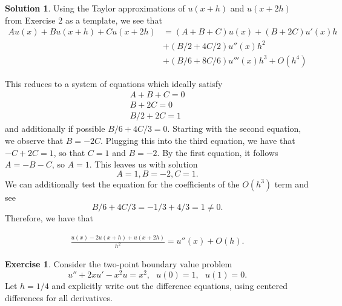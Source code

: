 \documentclass[12pt]{article}
\theoremstyle{definition}
\newtheorem{exer}{Exercise}
\newtheorem{sol}{Solution}
\theoremstyle{remark}
\begin{document}
\begin{sol}
    Using the Taylor approximations of $u(x + h)$ and $u(x + 2h)$ from Exercise 2 as a template, we see that
\begin{align*}
    A u(x) + B u(x+h) + C u(x+2h) &= (A + B + C) u(x) + (B + 2C) u'(x) h \\
                                  &+ (B / 2 + 4 C  / 2) u''(x) h^{2}\\
                                  &+ (B / 6 + 8 C / 6) u'''(x)h^{3} + O(h^{4})
\end{align*}

This reduces to a system of equations which ideally satisfy
\begin{align*}
A + B + C = 0\\
B + 2C = 0 \\
B / 2 + 2C = 1 
\end{align*}
and additionally if possible $ B / 6 + 4 C / 3 = 0$. Starting with the second equation, we observe that $B = - 2C$. Plugging this into the third equation, we have that $-C + 2C = 1$, so that $C = 1$ and $B = -2$. By the first equation, it follows $A = - B - C$, so $A = 1$. This leaves us with solution 
\begin{equation*}
A = 1 , B = -2, C = 1.
\end{equation*}
We can additionally test the equation for the coefficients of the $O(h^{3})$ term and see
\begin{equation*}
B / 6 + 4 C / 3 = -1 / 3 + 4 / 3 = 1 \neq 0.
\end{equation*}
Therefore, we have that 

\begin{align*}
    \frac{u(x) -2 u(x + h) + u(x + 2h)}{h^{2}} = u''(x) + O(h).
\end{align*}
\end{sol}

\newpage

\begin{exer}
Consider the two-point boundary value problem
\[ 
u'' + 2xu' - x^2 u = x^2 ,~~~u(0)=1,~~~u(1) = 0 .
\]
Let $h=1/4$ and explicitly write out the difference equations,
using centered differences for all derivatives.
\end{exer}
\end{document}
